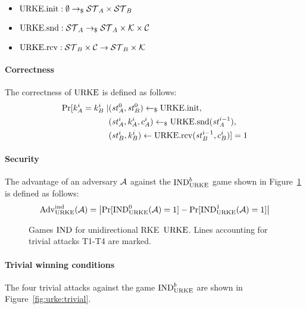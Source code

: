 \begin{itemize}
    \item $\mathrm{URKE}.\mathrm{init}: \emptyset\to_\$\mathcal{ST}_A\times\mathcal{ST}_B$
    \item $\mathrm{URKE}.\mathrm{snd}: \mathcal{ST}_A\to_\$\mathcal{ST}_A\times\mathcal{K}\times\mathcal{C}$
    \item $\mathrm{URKE}.\mathrm{rcv}: \mathcal{ST}_B\times\mathcal{C}\to\mathcal{ST}_B\times\mathcal{K}$
\end{itemize}

\paragraph{Correctness} The correctness of $\mathrm{URKE}$ is defined as follows:
\begin{align*} %
    \Pr[k_A^i=k_B^i\mid &(\st_A^0, \st_B^0)\getsr\URKEinit, \\
                        &(\st_A^i, k_A^i, c_A^i)\getsr\URKEsnd(\st_A^{i-1}), \\
                        &(\st_B^i, k_B^i)\gets\URKErcv(\st_B^{i-1}, c_B^i)] = 1
\end{align*}

\paragraph{Security} The advantage of an adversary $\mathcal{A}$ against the ${\mathrm{IND}}_{\mathrm{URKE}}^b$ game shown in Figure~\ref{fig:urke:ind} is defined as follows:
\[\mathrm{Adv}_{\mathrm{URKE}}^{\mathrm{ind}}(\mathcal{A}) = \left|\Pr[{\mathrm{IND}}_{\mathrm{URKE}}^0(\mathcal{A})=1] - \Pr[{\mathrm{IND}}_{\mathrm{URKE}}^1(\mathcal{A})=1]\right|\]

\begin{figure}[!ht]
    \centering
    \nicoresetlinenr%
    \fbox{%
        \scalebox{\codescalefactor}{%
        }%
    }
    \caption{%
        Games ${\mathrm{IND}}$ for unidirectional RKE~$\mathrm{URKE}$. Lines accounting for trivial attacks T1-T4 are marked.
    }
    \label{fig:urke:ind}
\end{figure}

\paragraph{Trivial winning conditions} The four trivial attacks against the game ${\mathrm{IND}}_{\mathrm{URKE}}^b$ are shown in Figure~\ref{fig:urke:trivial}.

